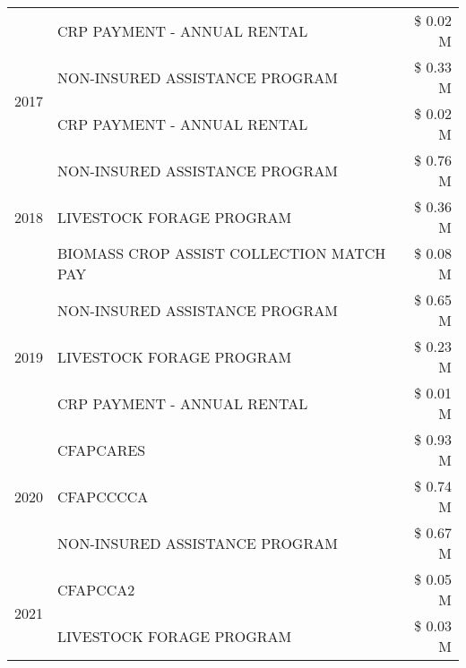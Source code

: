 \begin{tabular}{llr}
 & CRP PAYMENT - ANNUAL RENTAL & \$ 0.02 M \\
\cline{1-3}
\multirow[t]{2}{*}{2017} & NON-INSURED ASSISTANCE PROGRAM & \$ 0.33 M \\
 & CRP PAYMENT - ANNUAL RENTAL & \$ 0.02 M \\
\cline{1-3}
\multirow[t]{3}{*}{2018} & NON-INSURED ASSISTANCE PROGRAM & \$ 0.76 M \\
 & LIVESTOCK FORAGE PROGRAM & \$ 0.36 M \\
 & BIOMASS CROP ASSIST COLLECTION MATCH PAY & \$ 0.08 M \\
\cline{1-3}
\multirow[t]{3}{*}{2019} & NON-INSURED ASSISTANCE PROGRAM & \$ 0.65 M \\
 & LIVESTOCK FORAGE PROGRAM & \$ 0.23 M \\
 & CRP PAYMENT - ANNUAL RENTAL & \$ 0.01 M \\
\cline{1-3}
\multirow[t]{3}{*}{2020} & CFAPCARES & \$ 0.93 M \\
 & CFAPCCCCA & \$ 0.74 M \\
 & NON-INSURED ASSISTANCE PROGRAM & \$ 0.67 M \\
\cline{1-3}
\multirow[t]{2}{*}{2021} & CFAPCCA2 & \$ 0.05 M \\
 & LIVESTOCK FORAGE PROGRAM & \$ 0.03 M \\
\cline{1-3}
\bottomrule
\end{tabular}
